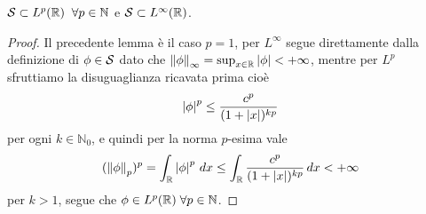 \begin{lemma}[  ]
  $ \mathcal{S} \subset L^p(\mathbb{R}) \;\;\forall p \in \mathbb{N} $ e $ \mathcal{S} \subset L^\infty(\mathbb{R})$.
\end{lemma}
\begin{proof}
  Il precedente lemma è il caso $ p = 1 $, per $ L^\infty $ segue direttamente dalla definizione di $ \phi \in \S $ dato che 
  $\norm{\phi}_\infty = \sup_{x \in \R} \abs{\phi} < +\infty $, mentre per $ L^p $ sfruttiamo la disuguaglianza ricavata prima cioè
  \begin{align}
    \abs{\phi}^p \leq \frac{c^p}{(1 + \abs{x})^{kp}}
  \end{align}
  per ogni $ k \in \mathbb{N}_0 $, e quindi per la norma $ p $-esima vale
  \begin{align}
    (\norm{\phi}_p)^p = \int_\R \abs{\phi}^p \,dx \leq \int_\R \frac{c^p}{(1 + \abs{x})^{kp}} \,dx < +\infty
  \end{align}
  per $ k > 1 $, segue che $ \phi \in L^p(\R) \; \forall p \in \mathbb{N} $.
\end{proof}

